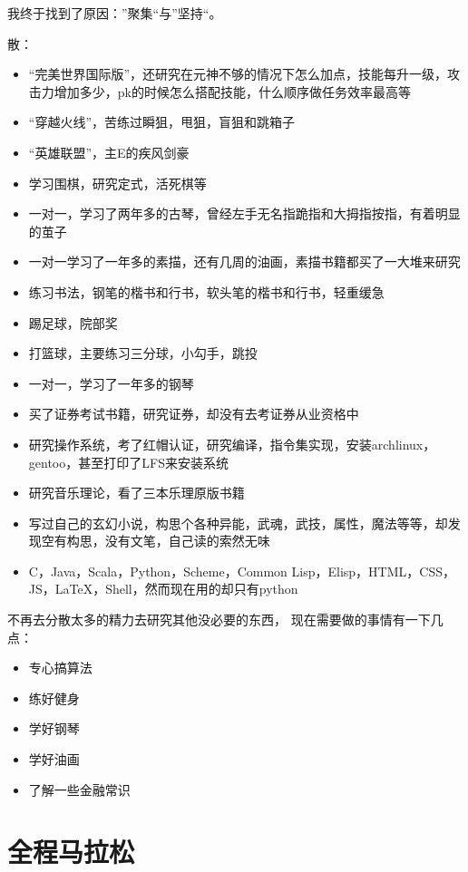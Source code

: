 我终于找到了原因：”聚集“与”坚持“。


散：
\begin{itemize}
\item “完美世界国际版”，还研究在元神不够的情况下怎么加点，技能每升一级，攻击力增加多少，pk的时候怎么搭配技能，什么顺序做任务效率最高等
\item “穿越火线”，苦练过瞬狙，甩狙，盲狙和跳箱子
\item “英雄联盟”，主E的疾风剑豪
\item 学习围棋，研究定式，活死棋等
\item 一对一，学习了两年多的古琴，曾经左手无名指跪指和大拇指按指，有着明显的茧子
\item 一对一学习了一年多的素描，还有几周的油画，素描书籍都买了一大堆来研究
\item 练习书法，钢笔的楷书和行书，软头笔的楷书和行书，轻重缓急
\item 踢足球，院部奖
\item 打篮球，主要练习三分球，小勾手，跳投
\item 一对一，学习了一年多的钢琴
\item 买了证券考试书籍，研究证券，却没有去考证券从业资格中
\item 研究操作系统，考了红帽认证，研究编译，指令集实现，安装archlinux，gentoo，甚至打印了LFS来安装系统
\item 研究音乐理论，看了三本乐理原版书籍
\item 写过自己的玄幻小说，构思个各种异能，武魂，武技，属性，魔法等等，却发现空有构思，没有文笔，自己读的索然无味
\item C，Java，Scala，Python，Scheme，Common Lisp，Elisp，HTML，CSS，JS，LaTeX，Shell，然而现在用的却只有python
\end{itemize}



不再去分散太多的精力去研究其他没必要的东西，
现在需要做的事情有一下几点：
\begin{itemize}
\item 专心搞算法
\item 练好健身
\item 学好钢琴
\item 学好油画
\item 了解一些金融常识
\end{itemize}



\section{全程马拉松}

